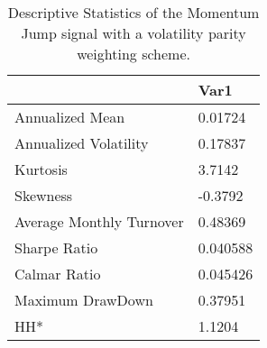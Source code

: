 \begin{table}[H]
\centering
\begin{tabular}{ll}
& Var1 \\ 
\hline 
Annualized Mean & 0.01724 \\ 
Annualized Volatility & 0.17837 \\ 
Kurtosis & 3.7142 \\ 
Skewness & -0.3792 \\ 
Average Monthly Turnover & 0.48369 \\ 
Sharpe Ratio & 0.040588 \\ 
Calmar Ratio & 0.045426 \\ 
Maximum DrawDown & 0.37951 \\ 
HH* & 1.1204 \\ 
\hline
\end{tabular}
\caption{Descriptive Statistics of the Momentum Jump signal with a volatility parity weighting scheme.}
\label{MOMJUMPVP}
\end{table}